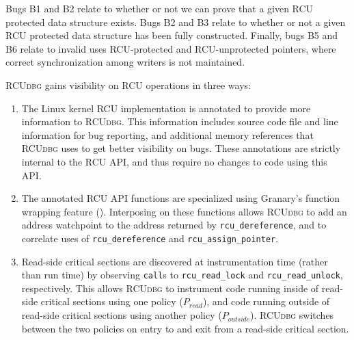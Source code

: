 \documentclass[preprint]{sigplanconf}
\newcommand{\toolname}[1]{{\scshape #1}}
\begin{document}
Bugs B1 and B2 relate to whether or not we can prove that a given RCU protected data structure exists. Bugs B2 and B3 relate to whether or not a given RCU protected data structure has been fully constructed. Finally, bugs B5 and B6 relate to invalid uses RCU-protected and RCU-unprotected pointers, where correct synchronization among writers is not maintained.



\toolname{RCUdbg} gains visibility on RCU operations in three ways: \begin{enumerate}
	\item The Linux kernel RCU implementation is annotated to provide more information to \toolname{RCUdbg}. This information includes source code file and line information for bug reporting, and additional memory references that \toolname{RCUdbg} uses to get better visibility on bugs. These annotations are strictly internal to the RCU API, and thus require no changes to code using this API.
	\item The annotated RCU API functions are specialized using Granary's function wrapping feature (). Interposing on these functions allows \toolname{RCUdbg} to add an address watchpoint to the address returned by \texttt{rcu\_\linebreak[0]dereference}, and to correlate uses of \texttt{rcu\_\linebreak[0]dereference} and \texttt{rcu\_\linebreak[0]assign\_\linebreak[0]pointer}.
	\item Read-side critical sections are discovered at instrumentation time (rather than run time) by observing \texttt{call}s to \texttt{rcu\_\linebreak[0]read\_\linebreak[0]lock} and \texttt{rcu\_\linebreak[0]read\_\linebreak[0]unlock}, respectively. This allows \toolname{RCUdbg} to instrument code running inside of read-side critical sections using one policy ($P_{read}$), and code running outside of read-side critical sections using another policy ($P_{outside}$). \toolname{RCUdbg} switches between the two policies on entry to and exit from a read-side critical section.
\end{enumerate}
\end{document}
